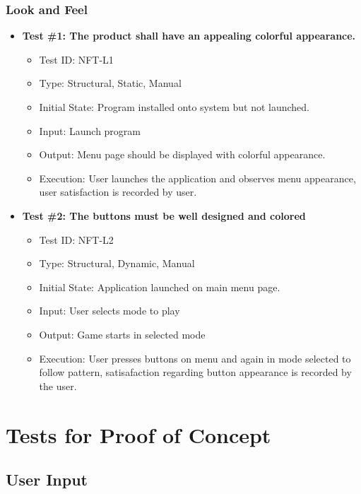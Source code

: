 \documentclass[12pt, titlepage]{article}
\begin{document}
\subsubsection{Look and Feel}
\begin{itemize}
\item \textbf{Test \#1: The product shall have an appealing colorful appearance.}
\begin{itemize}
\item Test ID: NFT-L1
\item Type: Structural, Static, Manual				
\item Initial State: Program installed onto system but not launched.		
\item Input: Launch program
\item Output: Menu page should be displayed with colorful appearance.		
\item Execution: User launches the application and observes menu appearance, user satisfaction is recorded by user.
\end{itemize}

\item \textbf{Test \#2: The buttons must be well designed and colored}
\begin{itemize}
\item Test ID: NFT-L2
\item Type: Structural, Dynamic, Manual			
\item Initial State: Application launched on main menu page.			
\item Input: User selects mode to play			
\item Output: Game starts in selected mode				
\item Execution: User presses buttons on menu and again in mode selected to follow pattern, satisafaction regarding button appearance is recorded by the user.
\end{itemize}

\end{itemize}


\section{Tests for Proof of Concept}

\subsection{User Input}
		
\end{document}
